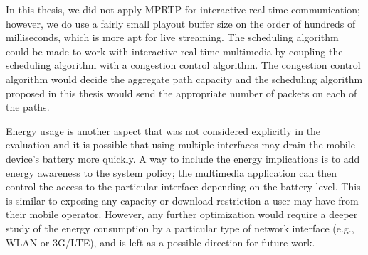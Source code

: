 In this thesis, we did not apply MPRTP for interactive real-time
communication; however, we do use a fairly small playout buffer size on the order of
hundreds of milliseconds, which is more apt for live streaming. The scheduling
algorithm could be made to work with interactive real-time multimedia by
coupling the scheduling algorithm with a congestion control algorithm. The
congestion control algorithm would decide the aggregate path capacity and the
scheduling algorithm proposed in this thesis would send the appropriate number
of packets on each of the paths.

Energy usage is another aspect that was not considered explicitly in the
evaluation and it is possible that using multiple interfaces may drain the
mobile device's battery more quickly. A way to include the energy implications
is to add energy awareness to the system policy; the multimedia application
can then control the access to the particular interface depending on the
battery level. This is similar to exposing any capacity or download
restriction a user may have from their mobile operator. However, any further
optimization would require a deeper study of the energy consumption by a
particular type of network interface (e.g., WLAN or 3G/LTE), and is left as a
possible direction for future work.
